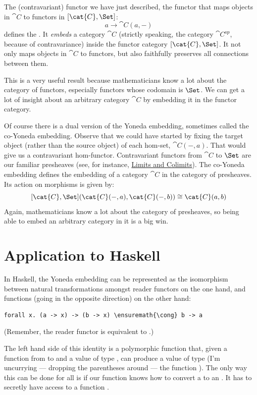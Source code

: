The (contravariant) functor we have just described, the functor that
maps objects in $\cat{C}$ to functors in $[\cat{C}, \Set]$:
\[a \to \cat{C}(a, -)\]
defines the . It \emph{embeds} a category
$\cat{C}$ (strictly speaking, the category $\cat{C}^{op}$,
because of contravariance) inside the functor category
$[\cat{C}, \Set]$. It not only maps objects in $\cat{C}$ to
functors, but also faithfully preserves all connections between them.

This is a very useful result because mathematicians know a lot about the
category of functors, especially functors whose codomain is
$\Set$. We can get a lot of insight about an arbitrary category
$\cat{C}$ by embedding it in the functor category.

Of course there is a dual version of the Yoneda embedding, sometimes
called the co-Yoneda embedding. Observe that we could have started by
fixing the target object (rather than the source object) of each
hom-set, $\cat{C}(-, a)$. That would give us a contravariant
hom-functor. Contravariant functors from $\cat{C}$ to $\Set$ are
our familiar presheaves (see, for instance,
\hyperref[limits-and-colimits]{Limits
and Colimits}). The co-Yoneda embedding defines the embedding of a
category $\cat{C}$ in the category of presheaves. Its action on morphisms
is given by:
\[[\cat{C}, \Set](\cat{C}(-, a), \cat{C}(-, b)) \cong \cat{C}(a, b)\]
Again, mathematicians know a lot about the category of presheaves, so
being able to embed an arbitrary category in it is a big win.

\section{Application to Haskell}

In Haskell, the Yoneda embedding can be represented as the isomorphism
between natural transformations amongst reader functors on the one hand,
and functions (going in the opposite direction) on the other hand:

\begin{Verbatim}[commandchars=\\\{\}]
forall x. (a -> x) -> (b -> x) \ensuremath{\cong} b -> a
\end{Verbatim}
(Remember, the reader functor is equivalent to
.)

The left hand side of this identity is a polymorphic function that,
given a function from  to  and a value of type
, can produce a value of type  (I'm uncurrying ---
dropping the parentheses around --- the function
). The only way this can be done for all
 is if our function knows how to convert a  to an
. It has to secretly have access to a function
.

